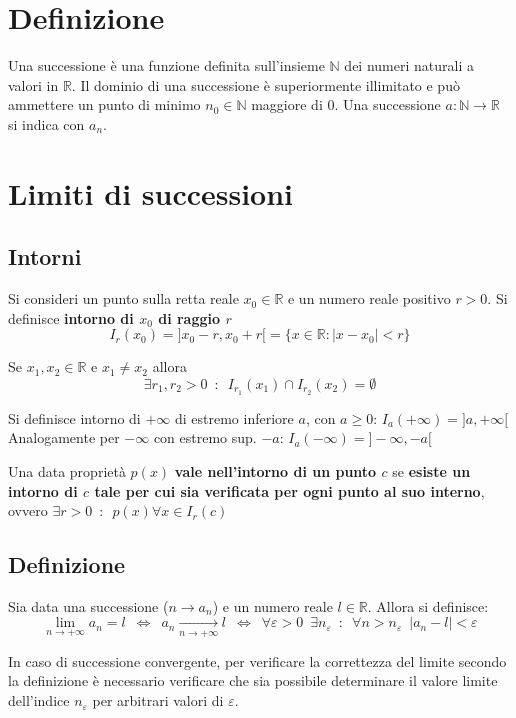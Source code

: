 \documentclass[10pt, oneside]{book}
\theoremstyle{plain}
\begin{document}
\section{Definizione}
\begin{defin}
Una successione è una funzione definita sull'insieme $\mathbb{N}$ dei numeri naturali a valori in $\mathbb{R}$. Il dominio di una successione è superiormente illimitato e può ammettere un punto di minimo $n_0 \in \mathbb{N}$ maggiore di 0. Una successione $a : \mathbb{N} \rightarrow \mathbb{R}$ si indica con $a_n$.
\end{defin}

\section{Limiti di successioni}
\subsection{Intorni}
\begin{defin}
    Si consideri un punto sulla retta reale $x_0 \in \mathbb{R}$ e un numero reale positivo $r > 0$. Si definisce \textbf{intorno di $x_0$ di raggio $r$} 
    \[I_r(x_0) = ]x_0 - r, x_0 +r[ = \{x \in \mathbb{R} : |x - x_0| < r\}\]
\end{defin}
\begin{oss}
    Se $x_1, x_2 \in \mathbb{R}$ e $x_1 \neq x_2$ allora 
    \[\exists r_1, r_2 > 0 \enspace : \enspace I_{r_1}(x_1) \cap I_{r_2}(x_2) = \emptyset\]
\end{oss}

\begin{defin}
    Si definisce intorno di $+\infty$ di estremo inferiore $a$, con $a \geq 0$: $I_a(+\infty) = ]a, +\infty[$
    \\Analogamente per $-\infty$ con estremo sup. $-a$:
    $I_{a}(-\infty) = ]-\infty, -a[$
\end{defin}

Una data proprietà $p(x)$ \textbf{vale nell'intorno di un punto $c$} se \textbf{esiste un intorno di $c$ tale per cui sia verificata per ogni punto al suo interno}, ovvero $\exists r>0 \enspace : \enspace p(x) \forall x \in I_r(c)$

\subsection{Definizione}
\begin{defin}
    Sia data una successione ($n \rightarrow a_n$) e un numero reale $l \in \mathbb{R}$. Allora si definisce:
    \[\lim \limits_{n \rightarrow + \infty} a_n = l \enspace \Leftrightarrow \enspace a_n \xrightarrow[n \rightarrow + \infty]{} l \enspace \Leftrightarrow \enspace \forall \varepsilon > 0 \enspace \exists n_\varepsilon \enspace : \enspace \forall n > n_\varepsilon \enspace |a_n - l| < \varepsilon\]
\end{defin}
In caso di successione convergente, per verificare la correttezza del limite secondo la definizione è necessario verificare che sia possibile determinare il valore limite dell'indice $n_\varepsilon$ per arbitrari valori di $\varepsilon$.
\end{document}
